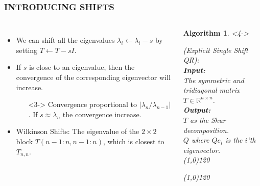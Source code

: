 \documentclass[a4paper,8pt]{beamer} %
\newtheorem{algo}{Algorithm}%
\begin{document}
\begin{frame}  %
\frametitle{INTRODUCING SHIFTS}
\begin{columns}

\column{7cm}
\begin{itemize}
	\item <1-> We can shift all the eigenvalues $\lambda_i\gets\lambda_{i}-s$ 
	by setting $T\gets T-sI$.
	\item <2->
	If $s$ is close to an eigenvalue, then 
	the convergence of the corresponding eigenvector will increase.
	\begin{enumerate}
	\item[]<3->
	Convergence %
	proportional to $|\lambda_{n}/\lambda_{n-1}|$.
	If $s\approx\lambda_{n}$ the convergence increase.%
	\end{enumerate}
	\item <4-> Wilkinson Shifts: The eigenvalue of the $2\times2$ block $T(n-1:n, n-1:n)$, which
	is closest to $T_{n,n}$. %
\end{itemize}

\column{5cm}
%
%
\begin{algo} <4->
\begin{footnotesize}
{
%
	(Explicit Single Shift QR):
%
}\\
\textbf{Input: }
{
%
	\\The symmetric and tridiagonal matrix $T\in\mathbb R^{n\times n}$.
%
}\\
\textbf{Output: }
{
%
	\\$T$ as the Shur decomposition.
	\\$Q$ where $Qe_i$ is the $i$'th eigenvector.
%
}\\
\line(1,0){120}
\begin{algorithmic}
%
\EndFor{}
%
\end{algorithmic}
\label{algQRSingleShiflExplicit}
\line(1,0){120}
\end{footnotesize}
\end{algo}
%
\end{columns}
\end{frame} %
\end{document}
